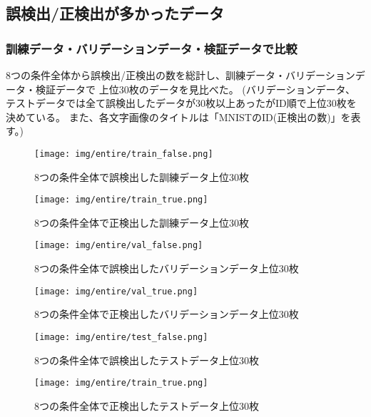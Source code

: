 \documentclass[12pt]{article}
\begin{document}
\subsection{誤検出/正検出が多かったデータ}

\subsubsection{訓練データ・バリデーションデータ・検証データで比較}

8つの条件全体から誤検出/正検出の数を総計し、訓練データ・バリデーションデータ・検証データで
上位30枚のデータを見比べた。
(バリデーションデータ、テストデータでは全て誤検出したデータが30枚以上あったがID順で上位30枚を決めている。
また、各文字画像のタイトルは「MNISTのID(正検出の数)」を表す。)

\newpage

\begin{figure}[H]
    \centering
    \texttt{[image: img/entire/train\_false.png]}
    \caption{8つの条件全体で誤検出した訓練データ上位30枚}
\end{figure}

\begin{figure}[H]
    \centering
    \texttt{[image: img/entire/train\_true.png]}
    \caption{8つの条件全体で正検出した訓練データ上位30枚}
\end{figure}

\begin{figure}[H]
    \centering
    \texttt{[image: img/entire/val\_false.png]}
    \caption{8つの条件全体で誤検出したバリデーションデータ上位30枚}
\end{figure}

\begin{figure}[H]
    \centering
    \texttt{[image: img/entire/val\_true.png]}
    \caption{8つの条件全体で正検出したバリデーションデータ上位30枚}
\end{figure}

\begin{figure}[H]
    \centering
    \texttt{[image: img/entire/test\_false.png]}
    \caption{8つの条件全体で誤検出したテストデータ上位30枚}
\end{figure}

\begin{figure}[H]
    \centering
    \texttt{[image: img/entire/train\_true.png]}
    \caption{8つの条件全体で正検出したテストデータ上位30枚}
\end{figure}
\end{document}
